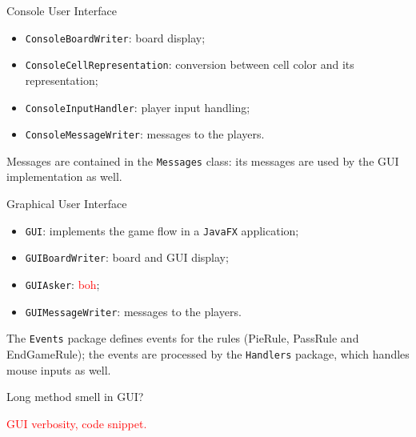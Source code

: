 \documentclass{beamer}
\begin{document}
  \begin{frame}{Console User Interface}

    \begin{itemize}
      \setlength\itemsep{1em}
      \item \texttt{ConsoleBoardWriter}: board display;
      \item \texttt{ConsoleCellRepresentation}: conversion between cell color and its representation;
      \item \texttt{ConsoleInputHandler}: player input handling;
      \item \texttt{ConsoleMessageWriter}: messages to the players.
    \end{itemize}

    \vspace{1em}

    Messages are contained in the \texttt{Messages} class: its messages are used by the GUI implementation as well.


  \end{frame}



  \begin{frame}{Graphical User Interface}

    \begin{itemize}
      \setlength\itemsep{1em}
      \item \texttt{GUI}: implements the game flow in a \texttt{JavaFX} application;
      \item \texttt{GUIBoardWriter}: board and GUI display;
      \item \texttt{GUIAsker}: \textcolor{red}{boh};
      \item \texttt{GUIMessageWriter}: messages to the players.
    \end{itemize}

    \vspace{1em}

    The \texttt{Events} package defines events for the rules (PieRule, PassRule and EndGameRule); the events are processed by the \texttt{Handlers} package, which handles mouse inputs as well.


  \end{frame}


  \begin{frame}{Long method smell in GUI?}

    \textcolor{red}{GUI verbosity, code snippet.}

  \end{frame}
\end{document}

